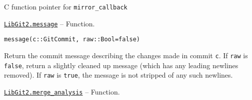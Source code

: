 \begin{adjustwidth}{2em}{0pt}

C function pointer for \texttt{mirror\_callback}



\end{adjustwidth}
\hypertarget{8348936587496719270}{}
\hyperlink{8348936587496719270}{\texttt{LibGit2.message}}  -- {Function.}

\begin{adjustwidth}{2em}{0pt}


\begin{verbatim}
message(c::GitCommit, raw::Bool=false)
\end{verbatim}

Return the commit message describing the changes made in commit \texttt{c}. If \texttt{raw} is \texttt{false}, return a slightly {\textquotedbl}cleaned up{\textquotedbl} message (which has any leading newlines removed). If \texttt{raw} is \texttt{true}, the message is not stripped of any such newlines.



\end{adjustwidth}
\hypertarget{8167742111561542209}{}
\hyperlink{8167742111561542209}{\texttt{LibGit2.merge\_analysis}}  -- {Function.}

